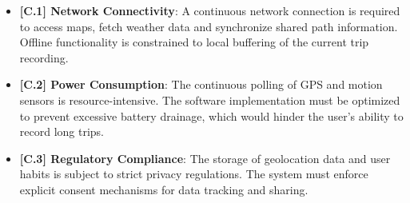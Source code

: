 \begin{itemize}
    \item \textbf{[C.1] Network Connectivity}: A continuous network connection is required to access maps, fetch weather data and synchronize shared path information. Offline functionality is constrained to local buffering of the current trip recording.

    \item \textbf{[C.2] Power Consumption}: The continuous polling of GPS and motion sensors is resource-intensive. The software implementation must be optimized to prevent excessive battery drainage, which would hinder the user's ability to record long trips.

    \item \textbf{[C.3] Regulatory Compliance}: The storage of geolocation data and user habits is subject to strict privacy regulations. The system must enforce explicit consent mechanisms for data tracking and sharing.
\end{itemize}